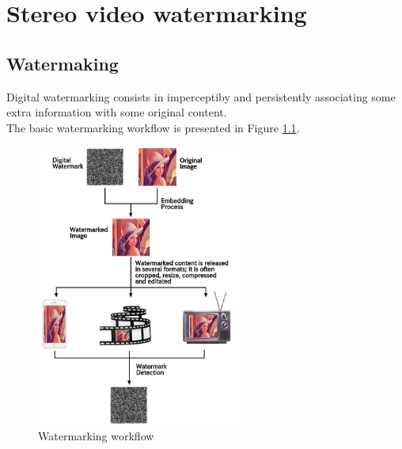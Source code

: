 \chapter{Stereo video watermarking}
\label{wat}

\section{Watermaking}

Digital watermarking consists in imperceptiby and persistently associating some extra information with some original content. \\
The basic watermarking workflow is presented in Figure \ref{fig:workflow}.\\
\begin{figure}[h!]
\centering
\includegraphics[width=0.6\textwidth]{./img/wat_workflow.png}
\caption{\small{Watermarking workflow}}
\label{fig:workflow}
\end{figure}
\clearpage
